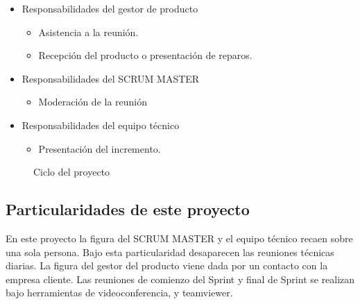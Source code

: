 	\begin{itemize}
		\item Responsabilidades del gestor de producto
		\begin{itemize}
			\item Asistencia a la reunión.
			\item Recepción del producto o presentación de reparos.
		\end{itemize}
		\item Responsabilidades del SCRUM MASTER
		\begin{itemize}
			\item Moderación de la reunión
		\end{itemize}	
		\item Responsabilidades del equipo técnico
		\begin{itemize}
			\item	Presentación del incremento.
		\end{itemize}
	\end{itemize}


\begin{figure}[H]
	\centering
	\caption[Ciclo]{Ciclo del proyecto}
	\label{fig:ciclo}
\end{figure}


\subsection{Particularidades de este proyecto}
\hspace*{2em}En este proyecto la figura del SCRUM MASTER y el equipo técnico recaen sobre una sola persona.  Bajo esta particularidad desaparecen las reuniones técnicas diarias.
La figura del gestor del producto viene dada por un contacto con la empresa cliente. Las reuniones de comienzo del Sprint y final de Sprint se realizan bajo herramientas de videoconferencia, y teamviewer.	\\ 









